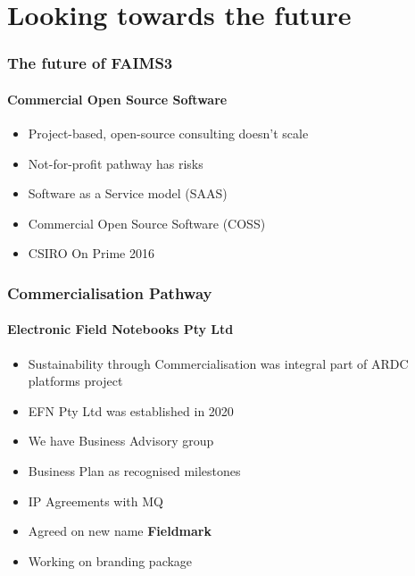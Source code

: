 \section{Looking towards the future}

\begin{sectionframe} %
	\frametitle{The future of FAIMS3}
	\framesubtitle{Commercial Open Source Software}

\begin{itemize}
    \item Project-based, open-source consulting doesn't scale
    \item Not-for-profit pathway has risks
    \item Software as a Service model (SAAS)
    \item Commercial Open Source Software (COSS)
    \item CSIRO On Prime 2016
    
\end{itemize}
\end{sectionframe}

\begin{frame} %
	\frametitle{Commercialisation Pathway}
	\framesubtitle{Electronic Field Notebooks Pty Ltd}

\begin{itemize}
   \item Sustainability through Commercialisation was integral part of ARDC platforms project
    \item EFN Pty Ltd was established in 2020
    \item We have Business Advisory group
    \item Business Plan as recognised milestones
    \item IP Agreements with MQ
    \item Agreed on new name \textbf{Fieldmark} 
    \item Working on branding package
\end{itemize}
\end{frame}


